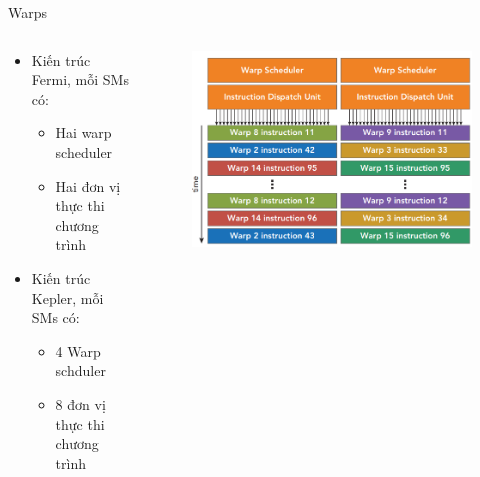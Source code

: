 \documentclass[10pt]{beamer}
\theoremstyle{remark}
\numberwithin{algocf}{section}
\numberwithin{equation}{section}
\numberwithin{dl}{section}
\numberwithin{figure}{section}
\begin{document}
\begin{frame}{Warps}
    \begin{columns}[onlytextwidth]
        \begin{column}{0.5\linewidth}
            \begin{itemize}
                \item Kiến trúc Fermi, mỗi SMs có:
                \begin{itemize}
                    \item Hai warp scheduler
                    \item Hai đơn vị thực thi chương trình
                \end{itemize}
                \item Kiến trúc Kepler, mỗi SMs có:
                \begin{itemize}
                    \item 4 Warp schduler
                    \item 8 đơn vị thực thi chương trình
                \end{itemize}
            \end{itemize}
        \end{column}
        \begin{column}{0.5\linewidth}
            \begin{figure}[H]
                \centering
                \includegraphics[width=\linewidth]{figures/CUDA/Warp_Scheduler.png}
            \end{figure}
        \end{column}
    \end{columns}
\end{frame}
\end{document}
